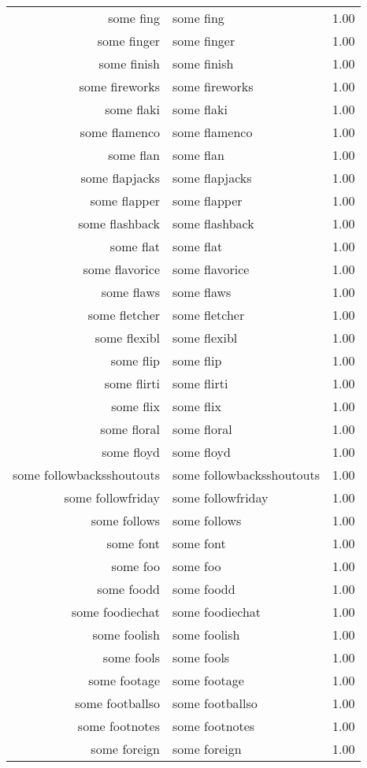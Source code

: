 \begin{table}[ht]
\begin{tabular}{rlr}
  some fing & some fing & 1.00 \\ 
  some finger & some finger & 1.00 \\ 
  some finish & some finish & 1.00 \\ 
  some fireworks & some fireworks & 1.00 \\ 
  some flaki & some flaki & 1.00 \\ 
  some flamenco & some flamenco & 1.00 \\ 
  some flan & some flan & 1.00 \\ 
  some flapjacks & some flapjacks & 1.00 \\ 
  some flapper & some flapper & 1.00 \\ 
  some flashback & some flashback & 1.00 \\ 
  some flat & some flat & 1.00 \\ 
  some flavorice & some flavorice & 1.00 \\ 
  some flaws & some flaws & 1.00 \\ 
  some fletcher & some fletcher & 1.00 \\ 
  some flexibl & some flexibl & 1.00 \\ 
  some flip & some flip & 1.00 \\ 
  some flirti & some flirti & 1.00 \\ 
  some flix & some flix & 1.00 \\ 
  some floral & some floral & 1.00 \\ 
  some floyd & some floyd & 1.00 \\ 
  some followbacksshoutouts & some followbacksshoutouts & 1.00 \\ 
  some followfriday & some followfriday & 1.00 \\ 
  some follows & some follows & 1.00 \\ 
  some font & some font & 1.00 \\ 
  some foo & some foo & 1.00 \\ 
  some foodd & some foodd & 1.00 \\ 
  some foodiechat & some foodiechat & 1.00 \\ 
  some foolish & some foolish & 1.00 \\ 
  some fools & some fools & 1.00 \\ 
  some footage & some footage & 1.00 \\ 
  some footballso & some footballso & 1.00 \\ 
  some footnotes & some footnotes & 1.00 \\ 
  some foreign & some foreign & 1.00 \\ 

\end{tabular}
\end{table}
